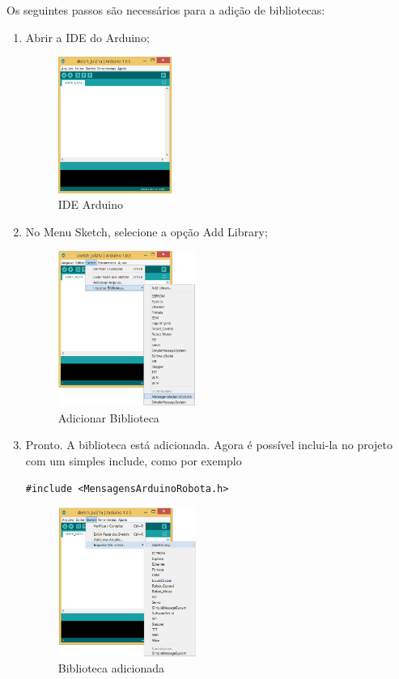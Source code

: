 Os seguintes passos são necessários para a adição de bibliotecas:
\begin{enumerate}
\item Abrir a IDE do Arduino;
\begin{figure}[!htb]
\centering
\includegraphics[width=3.7cm]{./include/chapters/sections/soft/section3/img/ide.png}
\caption{IDE Arduino}
\end{figure}
\item No Menu Sketch, selecione a opção Add Library;
\begin{figure}[!htbp]
\centering
\includegraphics[width=4.5cm]{./include/chapters/sections/soft/section3/img/libadd.png}
\caption{Adicionar Biblioteca}
\end{figure}
\item Pronto. A biblioteca está adicionada. Agora é possível inclui-la no projeto com um simples include, como por exemplo 
\begin{lstlisting}
#include <MensagensArduinoRobota.h>
\end{lstlisting}
\begin{figure}[!htbp]
\centering
\includegraphics[width=4.5cm]{./include/chapters/sections/soft/section3/img/addlib.png}
\caption{Biblioteca adicionada}
\end{figure}
\end{enumerate}

